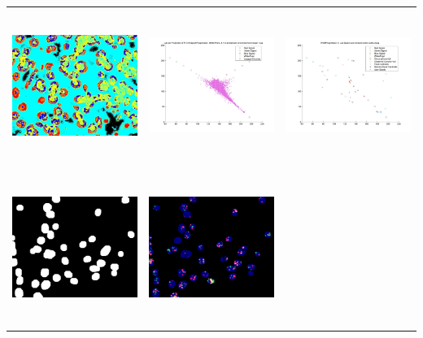 \begin{tabular}{ |c|c|c| }
\includegraphics[width=5.0cm,height=5.0cm]{images/Her2Fish/1_RGB_LabelImg.jpg}  &
\includegraphics[width=5.0cm,height=5.0cm]{images/Her2Fish/1_SampleChromas.jpg}  &
\includegraphics[width=5.0cm,height=5.0cm]{images/Her2Fish/2_abConvexHull.jpg}   \\
\includegraphics[width=5.0cm,height=5.0cm]{images/Her2Fish/2_Processedlabelimage.jpg}  &
\includegraphics[width=5.0cm,height=5.0cm]{images/Her2Fish/2_RGBMASK.jpg}           &

\end{tabular}
